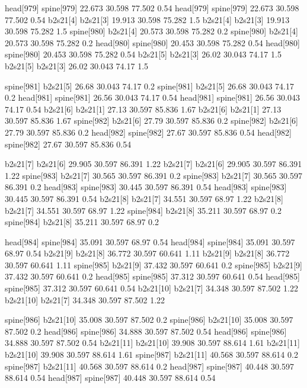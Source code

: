 head[979]    spine[979]    22.673    30.598    77.502    0.54
head[979]    spine[979]    22.673    30.598    77.502    0.54
b2s21[4]    b2s21[3]    19.913    30.598    75.282    1.5
b2s21[4]    b2s21[3]    19.913    30.598    75.282    1.5
spine[980]    b2s21[4]    20.573    30.598    75.282    0.2
spine[980]    b2s21[4]    20.573    30.598    75.282    0.2
head[980]    spine[980]    20.453    30.598    75.282    0.54
head[980]    spine[980]    20.453    30.598    75.282    0.54
b2s21[5]    b2s21[3]    26.02    30.043    74.17    1.5
b2s21[5]    b2s21[3]    26.02    30.043    74.17    1.5


spine[981]    b2s21[5]    26.68    30.043    74.17    0.2
spine[981]    b2s21[5]    26.68    30.043    74.17    0.2
head[981]    spine[981]    26.56    30.043    74.17    0.54
head[981]    spine[981]    26.56    30.043    74.17    0.54
b2s21[6]    b2s21[1]    27.13    30.597    85.836    1.67
b2s21[6]    b2s21[1]    27.13    30.597    85.836    1.67
spine[982]    b2s21[6]    27.79    30.597    85.836    0.2
spine[982]    b2s21[6]    27.79    30.597    85.836    0.2
head[982]    spine[982]    27.67    30.597    85.836    0.54
head[982]    spine[982]    27.67    30.597    85.836    0.54


b2s21[7]    b2s21[6]    29.905    30.597    86.391    1.22
b2s21[7]    b2s21[6]    29.905    30.597    86.391    1.22
spine[983]    b2s21[7]    30.565    30.597    86.391    0.2
spine[983]    b2s21[7]    30.565    30.597    86.391    0.2
head[983]    spine[983]    30.445    30.597    86.391    0.54
head[983]    spine[983]    30.445    30.597    86.391    0.54
b2s21[8]    b2s21[7]    34.551    30.597    68.97    1.22
b2s21[8]    b2s21[7]    34.551    30.597    68.97    1.22
spine[984]    b2s21[8]    35.211    30.597    68.97    0.2
spine[984]    b2s21[8]    35.211    30.597    68.97    0.2


head[984]    spine[984]    35.091    30.597    68.97    0.54
head[984]    spine[984]    35.091    30.597    68.97    0.54
b2s21[9]    b2s21[8]    36.772    30.597    60.641    1.11
b2s21[9]    b2s21[8]    36.772    30.597    60.641    1.11
spine[985]    b2s21[9]    37.432    30.597    60.641    0.2
spine[985]    b2s21[9]    37.432    30.597    60.641    0.2
head[985]    spine[985]    37.312    30.597    60.641    0.54
head[985]    spine[985]    37.312    30.597    60.641    0.54
b2s21[10]    b2s21[7]    34.348    30.597    87.502    1.22
b2s21[10]    b2s21[7]    34.348    30.597    87.502    1.22


spine[986]    b2s21[10]    35.008    30.597    87.502    0.2
spine[986]    b2s21[10]    35.008    30.597    87.502    0.2
head[986]    spine[986]    34.888    30.597    87.502    0.54
head[986]    spine[986]    34.888    30.597    87.502    0.54
b2s21[11]    b2s21[10]    39.908    30.597    88.614    1.61
b2s21[11]    b2s21[10]    39.908    30.597    88.614    1.61
spine[987]    b2s21[11]    40.568    30.597    88.614    0.2
spine[987]    b2s21[11]    40.568    30.597    88.614    0.2
head[987]    spine[987]    40.448    30.597    88.614    0.54
head[987]    spine[987]    40.448    30.597    88.614    0.54


